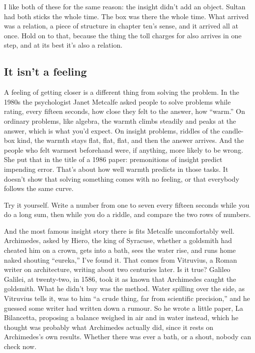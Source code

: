 \documentclass[11pt,twoside]{article}
\theoremstyle{thielethm}
\theoremstyle{thieledef}
\theoremstyle{thieledef}
\theoremstyle{thieledef}
\theoremstyle{thielethm}
\theoremstyle{thieleobs}
\theoremstyle{thielethm}
\begin{document}
I like both of these for the same reason: the insight didn't add an object. Sultan had both sticks the whole time. The box was there the whole time. What arrived was a relation, a piece of structure in chapter ten's sense, and it arrived all at once. Hold on to that, because the thing the toll charges for also arrives in one step, and at its best it's also a relation.

\subsection{It isn't a feeling}

A feeling of getting closer is a different thing from solving the problem. In the 1980s the psychologist Janet Metcalfe asked people to solve problems while rating, every fifteen seconds, how close they felt to the answer, how ``warm.'' On ordinary problems, like algebra, the warmth climbs steadily and peaks at the answer, which is what you'd expect. On insight problems, riddles of the candle-box kind, the warmth stays flat, flat, flat, and then the answer arrives. And the people who felt warmest beforehand were, if anything, more likely to be wrong. She put that in the title of a 1986 paper: premonitions of insight predict impending error. That's about how well warmth predicts in those tasks. It doesn't show that solving something comes with no feeling, or that everybody follows the same curve.

Try it yourself. Write a number from one to seven every fifteen seconds while you do a long sum, then while you do a riddle, and compare the two rows of numbers.

And the most famous insight story there is fits Metcalfe uncomfortably well. Archimedes, asked by Hiero, the king of Syracuse, whether a goldsmith had cheated him on a crown, gets into a bath, sees the water rise, and runs home naked shouting ``eureka,'' I've found it. That comes from Vitruvius, a Roman writer on architecture, writing about two centuries later. Is it true? Galileo Galilei, at twenty-two, in 1586, took it as known that Archimedes caught the goldsmith. What he didn't buy was the method. Water spilling over the side, as Vitruvius tells it, was to him ``a crude thing, far from scientific precision,'' and he guessed some writer had written down a rumour. So he wrote a little paper, La Bilancetta, proposing a balance weighed in air and in water instead, which he thought was probably what Archimedes actually did, since it rests on Archimedes's own results. Whether there was ever a bath, or a shout, nobody can check now.
\end{document}
